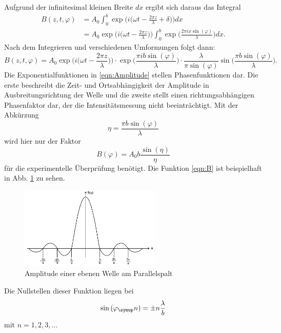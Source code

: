 Aufgrund der infinitesimal kleinen Breite $dx$ ergibt sich daraus das Integral
\begin{align}
  B(z,t,\varphi) &= A_0 \int_0^b \exp{\Bigg(i\bigg(\omega t - \frac{2 \pi z}{\lambda}
  + \delta \bigg)\Bigg)}dx \\
  &= A_0 \exp{\Bigg(i \bigg( \omega t - \frac{2\pi z}{\lambda}\bigg)\Bigg)}
  \int_0^b \exp{\bigg(\frac{2 \pi i x \sin{(\varphi)}}{\lambda}\bigg)}dx.
\end{align}
Nach dem Integrieren und verschiedenen Umformungen folgt dann:
\begin{equation}
  B(z,t,\varphi) = A_0 \exp{\Bigg(i \bigg( \omega t - \frac{2\pi z}{\lambda}\bigg)\Bigg)}
  \cdot \exp{\bigg(\frac{\pi i b \sin{(\varphi)}}{\lambda} \bigg)} \cdot
  \frac{\lambda}{\pi \sin{(\varphi)}} \sin{\bigg(\frac{\pi b \sin{(\varphi)}}{\lambda}\bigg)}.
  \label{eqn:Amplitude}
\end{equation}
Die Exponentialfunktionen in \eqref{eqn:Amplitude} stellen Phasenfunktionen dar.
Die erste beschreibt die Zeit- und Ortsabhängigkeit der Amplitude in Ausbreitungsrichtung
der Welle und die zweite stellt einen richtungsabhängigen Phasenfaktor dar, der
die Intensitätsmessung nicht beeinträchtigt.
Mit der Abkürzung
\begin{equation}
  \eta = \frac{\pi b \sin{(\varphi)}}{\lambda}
\end{equation}
wird hier nur der Faktor
\begin{equation}
  B(\varphi) = A_0 b \frac{\sin{(\eta)}}{\eta} \label{eqn:B}
\end{equation}
für die experimentelle Überprüfung benötigt.
Die Funktion \eqref{eqn:B} ist beispielhaft in Abb. \ref{fig:Amplitude} zu sehen.
\begin{figure}
  \centering
  \includegraphics[width=0.6\textwidth]{bilder/Amplitude.png}
  \caption{Amplitude einer ebenen Welle am Parallelspalt \cite{406}}
  \label{fig:Amplitude}
\end{figure}
Die Nullstellen dieser Funktion liegen bei
\begin{equation*}
  \sin{(\varphi_\su{n})} = \pm n \frac{\lambda}{b}
\end{equation*}
mit $n = 1, 2, 3,..$.

